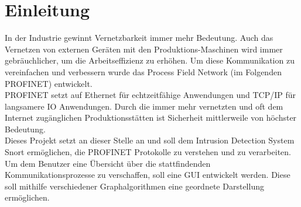 \chapter*{Einleitung}

In der Industrie gewinnt Vernetzbarkeit immer mehr Bedeutung. Auch das Vernetzen von externen Geräten mit den Produktions-Maschinen wird immer gebräuchlicher, um die Arbeitseffizienz zu erhöhen. Um diese Kommunikation zu vereinfachen und verbessern wurde das Process Field Network (im Folgenden PROFINET) entwickelt.\\
PROFINET setzt auf Ethernet für echtzeitfähige Anwendungen und TCP/IP für langsamere IO Anwendungen. Durch die immer mehr vernetzten und oft dem Internet zugänglichen Produktionsstätten ist Sicherheit mittlerweile von höchster Bedeutung. \\
Dieses Projekt setzt an dieser Stelle an und soll dem Intrusion Detection System Snort ermöglichen, die PROFINET Protokolle zu verstehen und zu verarbeiten. Um dem Benutzer eine Übersicht über die stattfindenden Kommunikationsprozesse zu verschaffen, soll eine GUI entwickelt werden. Diese soll mithilfe verschiedener Graphalgorithmen eine geordnete Darstellung ermöglichen. 